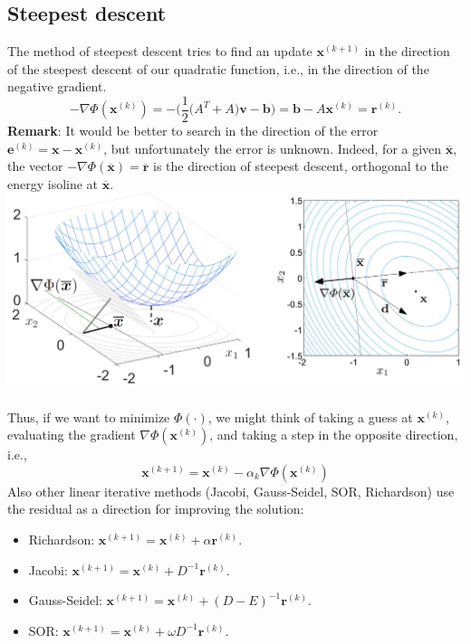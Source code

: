 \documentclass[11pt]{book}
\begin{document}
\subsection*{Steepest descent}
The method of steepest descent tries to find an update $\mathbf{x}^{(k+1)}$ in the direction of the steepest descent of our quadratic function, i.e., in the direction of the negative gradient.
$$-\nabla \Phi\left(\mathbf{x}^{(k)}\right)= - \biggl( \frac{1}{2} \bigl(A^{T} +A \bigl) \mathbf{v} - \mathbf{b} \biggl) =  \mathbf{b}-A \mathbf{x}^{(k)}=\mathbf{r}^{(k)}.$$
\textbf{Remark}: It would be better  to search in the direction of the error $\mathbf{e}^{(k)}=\mathbf{x}-\mathbf{x}^{(k)}$, but unfortunately the error is unknown. Indeed, for a given $\overline{\mathbf{x}}$, the vector $-\nabla 
\Phi(\overline{\mathbf{x}})=\overline{\mathbf{r}}$ is the direction of steepest descent, orthogonal to the energy isoline at $\overline{\mathbf{x}}$.\\
\includegraphics[scale = 0.12,center]{2023_09_05_b72ccc85584d9dc6fb5cg-077} \\ \\
Thus, if we want to minimize $\Phi(\cdot)$, we might think of taking a guess at $\mathbf{x}^{(k)}$, evaluating the gradient $\nabla \Phi\left(\mathbf{x}^{(k)}\right)$, and taking a step in the opposite direction, i.e.,
$$
\mathbf{x}^{(k+1)}=\mathbf{x}^{(k)}-\alpha_{k} \nabla \Phi\left(\mathbf{x}^{(k)}\right)
$$
Also other linear iterative methods (Jacobi, Gauss-Seidel, SOR, Richardson) use the residual as a direction for improving the solution:
\begin{itemize}
  \item Richardson: $\mathbf{x}^{(k+1)}=\mathbf{x}^{(k)}+\alpha \mathbf{r}^{(k)}$.\\
  \item Jacobi: $\mathbf{x}^{(k+1)}=\mathbf{x}^{(k)}+D^{-1} \mathbf{r}^{(k)}$.\\
  \item Gauss-Seidel: $\mathbf{x}^{(k+1)}=\mathbf{x}^{(k)}+(D-E)^{-1} \mathbf{r}^{(k)}$.\\
  \item SOR: $\mathbf{x}^{(k+1)}=\mathbf{x}^{(k)}+\omega D^{-1} \mathbf{r}^{(k)}$.\\
\end{itemize}
\end{document}

